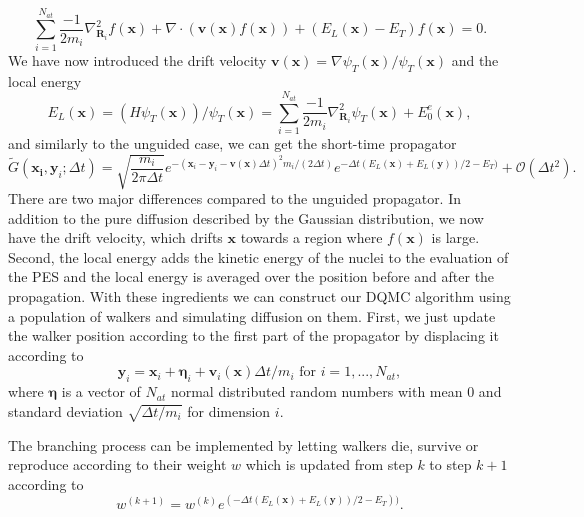 \documentclass [12pt]{report}
\begin{document}
\begin{equation} \label{eq:2.8}
\sum_{i=1}^{N_{at}} \frac{-1}{2m_i} \nabla^2_{\bm{R}_i} f(\bm{x}) + \nabla \cdot (\bm{v}(\bm{x}) f(\bm{x})) + (E_L(\bm{x}) - E_T)f(\bm{x}) = 0.
\end{equation}
We have now introduced the drift velocity $\bm{v}(\bm{x}) = \nabla \psi_T(\bm{x})/ \psi_T(\bm{x})$ and the local energy 
\begin{equation}\label{el}
E_L(\bm{x}) = (H\psi_T(\bm{x}))/\psi_T(\bm{x}) = \sum_{i=1}^{N_{at}} \frac{-1}{2m_i} \nabla^2_{\bm{R}_i} \psi_T(\bm{x}) + E_0^e(\bm{x}),
\end{equation}
and similarly to the unguided case, we can get the short-time propagator
\begin{equation} \label{eq:2.9}
\tilde{G}(\bm{x_i},\bm{y}_i;\Delta t) = \sqrt{\frac{m_i}{2 \pi \Delta t}} e^{-(\bm{x}_i-\bm{y}_i-\bm{v}(\bm{x})\Delta t)^2 m_i/(2 \Delta t)} e^{-\Delta t (E_L(\bm{x})+E_L(\bm{y}))/2 - E_T)} + \mathcal{O}(\Delta t^2).
\end{equation}
There are two major differences compared to the unguided propagator. In addition to the pure diffusion described by the Gaussian distribution, we now have the drift velocity, which drifts $\bm{x}$ towards a region where $f(\bm{x})$ is large. Second, the local energy adds the kinetic energy of the nuclei to the evaluation of the PES and the local energy is averaged over the position before and after the propagation. 
With these ingredients we can construct our DQMC algorithm using a population of walkers and simulating diffusion on them. First, we just update the walker position according to the first part of the propagator by displacing it according to
\begin{equation}\label{2.10}
\bm{y}_i = \bm{x}_i + \bm{\eta}_i + \bm{v}_i(\bm{x})\Delta t/m_i \text{ for } i=1,...,N_{at},
\end{equation}
where $\bm{\eta}$ is a vector of $N_{at}$ normal distributed random numbers with mean $0$ and standard deviation $\sqrt{\Delta t / m_i}$ for dimension $i$.

The branching process can be implemented by letting walkers die, survive or reproduce according to their weight $w$ which is updated from step $k$ to step $k+1$ according to 
\begin{equation}\label{eq:2.11} 
w^{(k+1)} = w^{(k)} e^{(-\Delta t(E_L(\bm{x}) + E_L(\bm{y}))/2 - E_T))}.
\end{equation}
\end{document}
